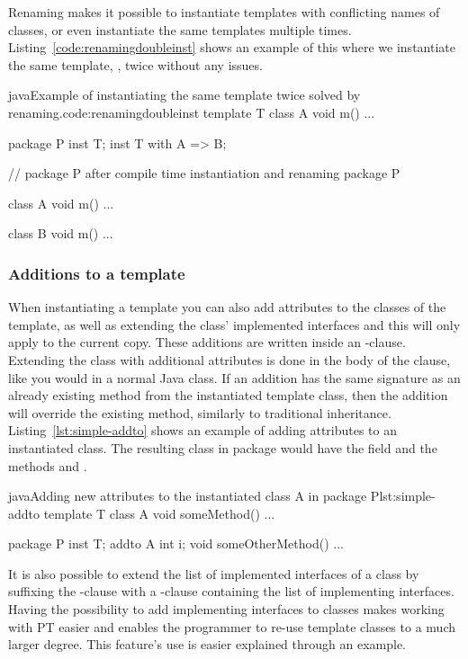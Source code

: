 Renaming makes it possible to instantiate templates with conflicting names of classes, or even instantiate the same templates multiple times.
Listing~\vref{code:renamingdoubleinst} shows an example of this where we instantiate the same template, , twice without any issues.

\begin{code}{java}{Example of instantiating the same template twice solved by renaming.}{code:renamingdoubleinst}
template T {
    class A {
        void m() { ... }
    }
}

package P {
    inst T;
    inst T with A => B;
}

// package P after compile time instantiation and renaming
package P {
    class A {
        void m() { ... }
    }

    class B {
        void m() { ... }
    }
}
\end{code}

\subsubsection{Additions to a template}\label{subsubsec:additions}

When instantiating a template you can also add attributes to the classes of the template, as well as extending the class' implemented interfaces and this will only apply to the current copy.
These additions are written inside an -clause.
Extending the class with additional attributes is done in the body of the clause, like you would in a normal Java class.
If an addition has the same signature as an already existing method from the instantiated template class, then the addition will override the existing method, similarly to traditional inheritance.
Listing~\vref{lst:simple-addto} shows an example of adding attributes to an instantiated class.
The resulting class  in package  would have the field  and the methods  and .

\begin{code}{java}{Adding new attributes to the instantiated class A in package P}{lst:simple-addto}
    template T {
        class A {
            void someMethod() { ... }
        }
    }

    package P {
        inst T;
        addto A {
            int i;
            void someOtherMethod() { ... }
        }
    }
\end{code}

It is also possible to extend the list of implemented interfaces of a class by suffixing the -clause with a -clause containing the list of implementing interfaces.
Having the possibility to add implementing interfaces to classes makes working with PT easier and enables the programmer to re-use template classes to a much larger degree.
This feature's use is easier explained through an example.

